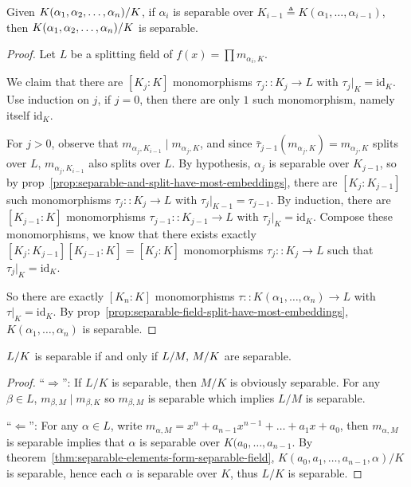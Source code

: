 \begin{theorem} \label{thm:separable-elements-form-separable-field}
  Given ${K(\alpha_1, \alpha_2, \dots, \alpha_n)}/{K}$, if $\alpha_i$ is
  separable over $K_{i-1} \triangleq K(\alpha_1, \dots, \alpha_{i-1})$, then
  ${K(\alpha_1, \alpha_2, \dots, \alpha_n)}/{K}$ is separable.

  \begin{proof}
    Let $L$ be a splitting field of $f(x) = \prod m_{\alpha_i, K}$.

    We claim that there are $[K_j: K]$ monomorphisms $\tau_j:: K_j \to L$ with $\tau_j \big|_K = \text{id}_K$.
    Use induction on $j$, if $j = 0$, then there are only $1$ such monomorphism, namely itself $\text{id}_K$.

    For $j > 0$, observe that $m_{\alpha_j, K_{i-1}} \mid m_{\alpha_j, K}$, and since $\bar\tau_{j-1}
    (m_{\alpha_j, K}) = m_{\alpha_j, K}$ splits over $L$, $m_{\alpha_j, K_{i-1}}$ also splits over $L$.
    By hypothesis, $\alpha_j$ is separable over $K_{j-1}$, so by prop~\ref{prop:separable-and-split-have-most-embeddings},
    there are $[K_j: K_{j-1}]$ such monomorphisms $\tau_j:: K_j \to L$ with $\tau_j \big|_{K-1} = \tau_{j-1}$.
    By induction, there are $[K_{j-1}: K]$ monomorphisms $\tau_{j-1}:: K_{j-1} \to L$
    with $\tau_j \big|_K = \text{id}_K$. Compose these monomorphisms, we know that there
    exists exactly $[K_j: K_{j-1}][K_{j-1}: K] = [K_j: K]$ monomorphisms $\tau_j:: K_j \to L$ such that
    $\tau_j \big|_K = \text{id}_K$.

    So there are exactly $[K_n: K]$ monomorphisms $\tau :: K(\alpha_1, \dots, \alpha_n) \to L$
    with $\tau\big|_K = \text{id}_K$.
    By prop~\ref{prop:separable-field-split-have-most-embeddings}, $K(\alpha_1, \dots, \alpha_n)$ is separable.

  \end{proof}
\end{theorem}

\begin{theorem}
  ${L}/{K}$ is separable if and only if ${L}/{M},\, {M}/{K}$ are separable.

  \begin{proof}
    ``$\Rightarrow$'': If $L/K$ is separable, then $M/K$ is obviously separable. For any $\beta \in L$,
    $m_{\beta, M} \mid m_{\beta, K}$ so $m_{\beta, M}$ is separable which implies $L/M$ is separable.

    ``$\Leftarrow$'': For any $\alpha \in L$, write $m_{\alpha, M} = x^n + a_{n-1}x^{n-1} + \dots + a_1 x + a_0$,
    then $m_{\alpha, M}$ is separable implies that $\alpha$ is separable over $K(a_0, \dots, a_{n-1}$.
    By theorem~\ref{thm:separable-elements-form-separable-field},
    $K(a_0, a_1, \dots, a_{n-1}, \alpha) / K$ is separable, hence each $\alpha$ is separable over $K$,
    thus $L/K$ is separable.
  \end{proof}
\end{theorem}
